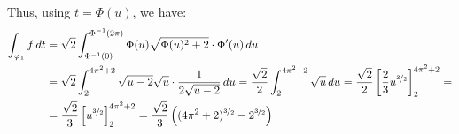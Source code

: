 \begin{ejercicio}
    Thus, using $t=\Phi(u)$, we have:
    \begin{align*}
        \int_{\varphi_1} f \, dt &= \sqrt{2} \int_{\Phi^{-1}(0)}^{\Phi^{-1}(2\pi)} \Phi(u) \sqrt{\Phi(u)^2 + 2} \cdot \Phi'(u) \, du \\
        &= \sqrt{2} \int_{2}^{4\pi^2 + 2} \sqrt{u-2} \sqrt{u} \cdot \frac{1}{2\sqrt{u-2}} \, du
        = \frac{\sqrt{2}}{2} \int_{2}^{4\pi^2 + 2} \sqrt{u} \, du
        = \frac{\sqrt{2}}{2} \left[ \frac{2}{3} u^{\nicefrac{3}{2}} \right]_{2}^{4\pi^2 + 2}
        =\\&= 
        \frac{\sqrt{2}}{3} \left[ u^{\nicefrac{3}{2}} \right]_{2}^{4\pi^2 + 2}
        = \frac{\sqrt{2}}{3} \left( (4\pi^2 + 2)^{\nicefrac{3}{2}} - 2^{\nicefrac{3}{2}} \right)
    \end{align*}
\end{ejercicio}


